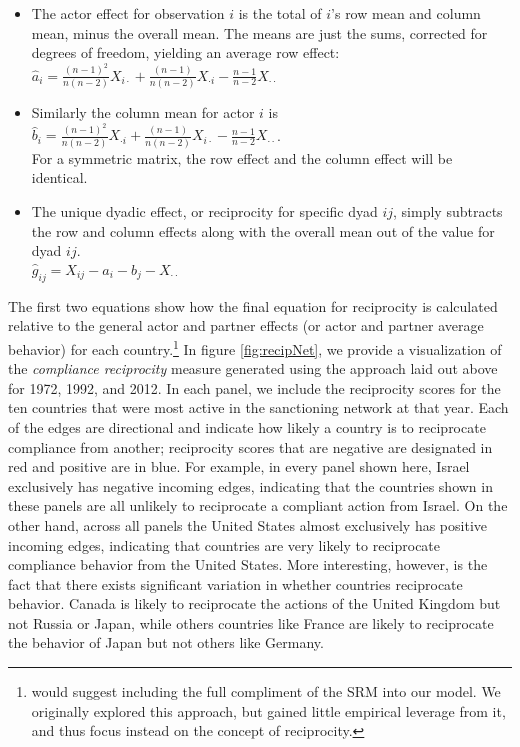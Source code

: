  \begin{itemize}
	 \item The actor effect for observation $i$ is the total of $i$'s row mean and column mean, minus the overall mean.  The means are just the sums, corrected for degrees of freedom, yielding an average row effect:\\
	 $\hat{a}_i = \frac{(n-1)^2}{n(n-2)} X_{i \cdot} + \frac{(n-1)}{n(n-2)} X_{\cdot i} -  \frac{n-1}{n-2} X_{\cdot \cdot} $
	\item Similarly the column mean for actor $i$ is \\
	 $\hat{b}_i = \frac{(n-1)^2}{n(n-2)} X_{\cdot i} + \frac{(n-1)}{n(n-2)} X_{i \cdot } -  \frac{n-1}{n-2} X_{\cdot \cdot} $.\\ For a symmetric matrix, the row effect and the column effect will be identical.
	\item The unique dyadic effect, or reciprocity for specific dyad $ij$, simply subtracts the row and column effects along with the overall mean out of the value for dyad $ij$. \\
	$\hat{g}_{ij} = X_{ij} - \hat{a}_i - \hat{b}_j - X_{\cdot \cdot}$
 \end{itemize}

\doublespacing
The first two equations show how the final equation for reciprocity is calculated relative to the general actor and partner effects (or actor and partner average behavior) for each country.\footnote{\cite{kenny1994interpersonal} would suggest including the full compliment of the SRM into our model. We originally explored this approach, but gained little empirical leverage from it, and thus focus instead on the concept of reciprocity.} In figure \ref{fig:recipNet}, we provide a visualization of the \textit{compliance reciprocity} measure generated using the approach laid out above for 1972, 1992, and 2012. In each panel, we include the reciprocity scores for the ten countries that were most active in the sanctioning network at that year. Each of the edges are directional and indicate how likely a country is to reciprocate compliance from another; reciprocity scores that are negative are designated in red and positive are in blue. For example, in every panel shown here, Israel exclusively has negative incoming edges, indicating that the countries shown in these panels are all unlikely to reciprocate a compliant action from Israel. On the other hand, across all panels the United States almost exclusively has positive incoming edges, indicating that countries are very likely to reciprocate compliance behavior from the United States. More interesting, however, is the fact that there exists significant variation in whether countries reciprocate behavior. Canada is likely to reciprocate the actions of the United Kingdom but not Russia or Japan, while others countries like France are likely to reciprocate the behavior of Japan but not others like Germany.


